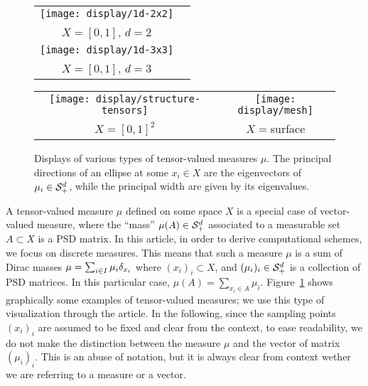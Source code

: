 \begin{figure}\centering
\begin{minipage}[c]{.48\linewidth}
\begin{tabular}{@{}c@{}c@{}}
{\texttt{[image: display/1d-2x2]}}\\
$X=[0,1]$, $d=2$ \\[2mm]
{\texttt{[image: display/1d-3x3]}} \\
$X=[0,1]$, $d=3$
\end{tabular}
\end{minipage} 
\begin{minipage}[c]{.49\linewidth}
\begin{tabular}{@{}c@{}c@{}}
\texttt{[image: display/structure-tensors]}&
\texttt{[image: display/mesh]}\\
 $X=[0,1]^2$ & $X=$surface \\
\end{tabular}
   \end{minipage}
\caption{Displays of various types of tensor-valued measures $\mu$. The principal directions of an ellipse at some $x_i \in X$ are the eigenvectors of $\mu_i \in \mathcal{S}_+^d$, while the principal width are given by its eigenvalues. 
} \label{fig:display}
\end{figure}


A tensor-valued measure $\mu$ defined on some space $X$ is a special case of vector-valued measure, where the ``mass'' $\mu(A) \in \mathcal{S}_+^d$ associated to a measurable set $A \subset X$ is a PSD matrix. In this article, in order to derive computational schemes, we focus on discrete measures. This means that such a measure $\mu$ is a sum of Dirac masses
$\mu = \sum_{i \in I} \mu_i \delta_{x_i}$
where $(x_i)_i \subset X$, and $(\mu_i)_i \in \mathcal{S}_+^d$ is a collection of PSD matrices. In this particular case, $\mu(A)=\sum_{x_i \in A} \mu_i$. 
%
Figure~\ref{fig:display} shows graphically some examples of tensor-valued measures; we use this type of visualization through the article. 
%
In the following, since the sampling points $(x_i)_i$ are assumed to be fixed and clear from the context, to ease readability, we do not make the distinction between the measure $\mu$ and the vector of matrix $(\mu_i)_i$. This is an abuse of notation, but it is always clear from context wether we are referring to a measure or a vector. 

